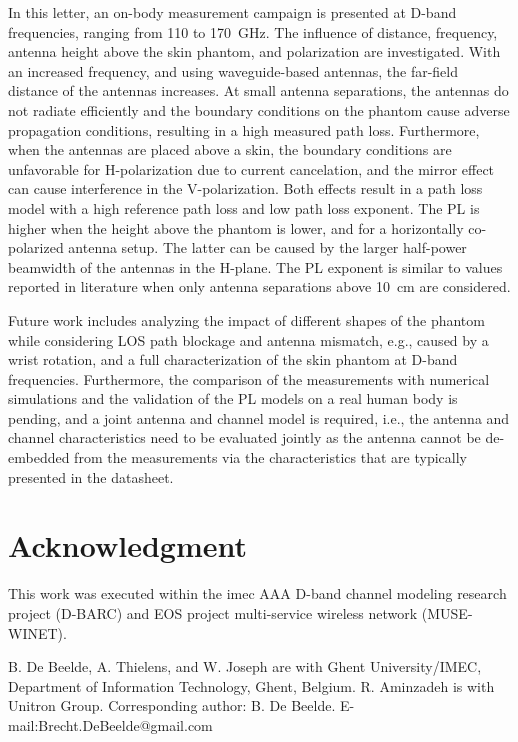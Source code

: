 \documentclass[preprint]{rsl}
\begin{document}
In this letter, an on-body measurement campaign is presented at D-band frequencies, ranging from 110 to 170~GHz. 
The influence of distance, frequency, antenna height above the skin phantom, and polarization are investigated.
With an increased frequency, and using waveguide-based antennas, the far-field distance of the antennas increases. 
At small antenna separations, the antennas do not radiate efficiently and the boundary conditions on the phantom cause adverse propagation conditions, resulting in a high measured path loss. 
Furthermore, when the antennas are placed above a skin, the boundary conditions are unfavorable for H-polarization due to current cancelation, and the mirror effect can cause interference in the V-polarization.
Both effects result in a path loss model with a high reference path loss and low path loss exponent.
The PL is higher when the height above the phantom is lower, and for a horizontally co-polarized antenna setup. 
The latter can be caused by the larger half-power beamwidth of the antennas in the H-plane.
The PL exponent is similar to values reported in literature when only antenna separations above 10~cm are considered.

Future work includes analyzing the impact of different shapes of the phantom while considering LOS path blockage and antenna mismatch, e.g., caused by a wrist rotation, and a full characterization of the skin phantom at D-band frequencies. 
Furthermore, the comparison of the measurements with numerical simulations and the validation of the PL models on a real human body is pending, and a joint antenna and channel model is required, i.e., the antenna and channel characteristics need to be evaluated jointly as the antenna cannot be de-embedded from the measurements via the characteristics that are typically presented in the datasheet.

\section{Acknowledgment}

This work was executed within the imec AAA D-band channel modeling research project (D-BARC) and EOS project multi-service wireless network (MUSE-WINET). 

\vspace{3pt}

\suppressfloats


\suppressfloats

\vspace{7pt}

%
%
\noindent\small
B. De Beelde, A. Thielens, and W. Joseph are with Ghent University/IMEC, Department of Information Technology, Ghent, Belgium. 
R. Aminzadeh is with Unitron Group. 
Corresponding author: B. De Beelde. 
E-mail:Brecht.DeBeelde@gmail.com
\end{document}
